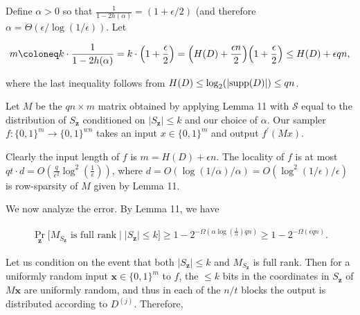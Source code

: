 Define $\alpha>0$ so that $\frac{1}{1-2h(\alpha)}=(1+\epsilon/2)$ (and therefore $\alpha=\Theta(\epsilon/\log(1/\epsilon))$.
Let\par


\[\begin{gathered}
m\coloneq k\cdot\frac{1}{1-2h(\alpha)}=k\cdot\Bigl(1+\frac{\epsilon}{2}\Bigr)=\Bigl(H(D)+\frac{\epsilon n}{2}\Bigr)\Bigl(1+\frac{\epsilon}{2}\Bigr)\leq H(D)+\epsilon qn,
\end{gathered}\]


where the last inequality follows from $H(D)\leq\log_{2}(\lvert{\rm supp}(D)\rvert)\leq qn$.\par




Let $M$ be the $qn\times m$ matrix obtained by applying Lemma 11 with $\mathcal{S}$ equal to the distribution of $S_{\boldsymbol{z}}$ conditioned on $\lvert S_{\boldsymbol{z}}\rvert\leq k$ and our choice of $\alpha$.
Our sampler $f\colon\{0,1\}^{m}\to\{0,1\}^{wn}$ takes an input $x\in\{0,1\}^{m}$ and output $f^{\prime}(Mx)$.\par




Clearly the input length of $f$ is $m=H(D)+\epsilon n$.
The locality of $f$ is at most $qt\cdot d=O(\frac{q}{\epsilon^{2}}\log^{2}\left(\frac{1}{\epsilon}\right))$, where $d=O(\log(1/\alpha)/\alpha)=O(\log^{2}(1/\epsilon)/\epsilon)$ is row-sparsity of $M$ given by Lemma 11.\par




We now analyze the error.
By Lemma 11, we have\par


\[\begin{gathered}
\displaystyle\Pr_{\boldsymbol{z}}\bigl[\text{$M_{S_{\boldsymbol{z}}}$ is full rank}\mid\lvert S_{\boldsymbol{z}}\rvert\leq k\bigr]\geq 1-2^{-\Omega(\alpha\log(\frac{1}{\alpha})qn)}\geq 1-2^{-\Omega(\epsilon qn)}.
\end{gathered}\]




Let us condition on the event that both $\lvert S_{\boldsymbol{z}}\rvert\leq k$ and $M_{S_{\boldsymbol{z}}}$ is full rank.
Then for a uniformly random input $\boldsymbol{x}\in\{0,1\}^{m}$ to $f$, the $\leq k$ bits in the coordinates in $S_{\boldsymbol{z}}$ of $M\boldsymbol{x}$ are uniformly random, and thus in each of the $n/t$ blocks the output is distributed according to $D^{(j)}$. Therefore,\par


